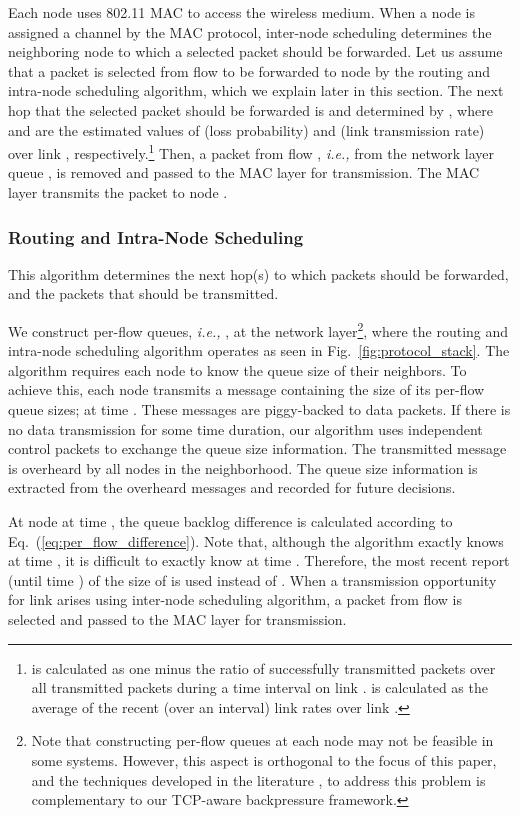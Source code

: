 \documentclass[conference]{IEEEtran}
\newcommand{\ie}{{\em i.e., }}
\begin{document}
Each node uses 802.11 MAC to access the wireless medium. When a node  is assigned a channel by the MAC protocol, inter-node scheduling determines the neighboring node to which a selected packet should be forwarded. Let us assume that a packet is selected from flow  to be forwarded to node  by the routing and intra-node scheduling algorithm, which we explain later in this section. The next hop that the selected packet should be forwarded is  and determined by , where  and  are the estimated values of  (loss probability) and  (link transmission rate) over link , respectively.\footnote{\scriptsize  is calculated as one minus the ratio of successfully transmitted packets over all transmitted packets during a time interval  on link .  is calculated as the average of the recent (over an interval) link rates over link .}
Then, a packet from flow , \ie from the network layer queue , is removed and passed to the MAC layer for transmission. The MAC layer transmits the packet to node .





\subsubsection{Routing and Intra-Node Scheduling}
This algorithm determines the next hop(s) to which packets should be forwarded, and the packets that should be transmitted.

We construct per-flow queues, \ie , at the network layer\footnote{\scriptsize Note that constructing per-flow queues at each node may not be feasible in some systems. However, this aspect is orthogonal to the focus of this paper, and the techniques developed in the literature \cite{diffmax}, \cite{locbui} to address this problem is complementary to our TCP-aware backpressure framework.}, where the routing and intra-node scheduling algorithm operates as seen in Fig.~\ref{fig:protocol_stack}. The algorithm requires each node to know the queue size of their neighbors. To achieve this, each node  transmits a message containing the size of its per-flow queue sizes;  at time . These messages are piggy-backed to data packets. If there is no data transmission for some time duration, our algorithm uses independent control packets to exchange the queue size information. The transmitted message is overheard by all nodes in the neighborhood. The queue size information is extracted from the overheard messages and recorded for future decisions.

At node  at time , the queue backlog difference is calculated according to Eq.~(\ref{eq:per_flow_difference}). Note that, although the algorithm exactly knows  at time , it is difficult to exactly know  at time . Therefore, the most recent report (until time ) of the size of  is used instead of .
When a transmission opportunity for link  arises using inter-node scheduling algorithm, a packet from flow  is selected and passed to the MAC layer for transmission.
\end{document}
